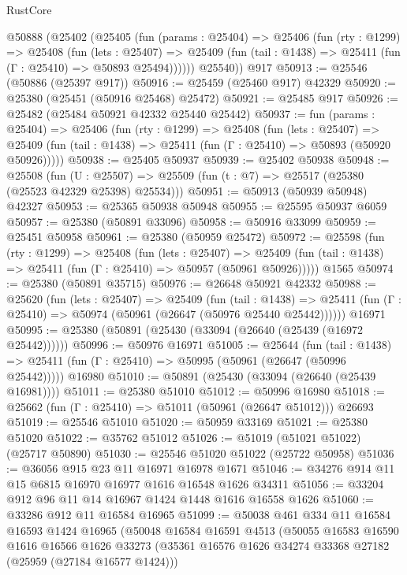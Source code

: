 \begin{lexlean}{RustCore}
\begin{coremodule}
    @50888
      (@25402
        (@25405
          (fun (params : @25404) =>
          @25406
            (fun (rty : @1299) =>
            @25408
              (fun (lets : @25407) =>
              @25409 (fun (tail : @1438) => @25411 (fun (Γ : @25410) => @50893 @25494))))))
        @25540))
    @917
@50913 := @25546 (@50886 (@25397 @917))
@50916 := @25459 (@25460 @917) @42329
@50920 := @25380 (@25451 (@50916 @25468) @25472)
@50921 := @25485 @917
@50926 := @25482 (@25484 @50921 @42332 @25440 @25442)
@50937 := fun (params : @25404) =>
  @25406
    (fun (rty : @1299) =>
    @25408
      (fun (lets : @25407) =>
      @25409 (fun (tail : @1438) => @25411 (fun (Γ : @25410) => @50893 (@50920 @50926)))))
@50938 := @25405 @50937
@50939 := @25402 @50938
@50948 := @25508
    (fun (U : @25507) => @25509 (fun (t : @7) => @25517 (@25380 (@25523 @42329 @25398) @25534)))
@50951 := @50913 (@50939 @50948) @42327
@50953 := @25365 @50938 @50948
@50955 := @25595 @50937 @6059
@50957 := @25380 (@50891 @33096)
@50958 := @50916 @33099
@50959 := @25451 @50958
@50961 := @25380 (@50959 @25472)
@50972 := @25598
    (fun (rty : @1299) =>
    @25408
      (fun (lets : @25407) =>
      @25409 (fun (tail : @1438) => @25411 (fun (Γ : @25410) => @50957 (@50961 @50926)))))
    @1565
@50974 := @25380 (@50891 @35715)
@50976 := @26648 @50921 @42332
@50988 := @25620
    (fun (lets : @25407) =>
    @25409
      (fun (tail : @1438) =>
      @25411 (fun (Γ : @25410) => @50974 (@50961 (@26647 (@50976 @25440 @25442))))))
    @16971
@50995 := @25380 (@50891 (@25430 (@33094 (@26640 (@25439 (@16972 @25442))))))
@50996 := @50976 @16971
@51005 := @25644
    (fun (tail : @1438) => @25411 (fun (Γ : @25410) => @50995 (@50961 (@26647 (@50996 @25442)))))
    @16980
@51010 := @50891 (@25430 (@33094 (@26640 (@25439 @16981))))
@51011 := @25380 @51010
@51012 := @50996 @16980
@51018 := @25662 (fun (Γ : @25410) => @51011 (@50961 (@26647 @51012))) @26693
@51019 := @25546 @51010
@51020 := @50959 @33169
@51021 := @25380 @51020
@51022 := @35762 @51012
@51026 := @51019 (@51021 @51022) (@25717 @50890)
@51030 := @25546 @51020 @51022 (@25722 @50958)
@51036 := @36056 @915 @23 @11 @16971 @16978 @1671
@51046 := @34276 @914 @11 @15 @6815 @16970 @16977 @1616 @16548 @1626 @34311
@51056 := @33204 @912 @96 @11 @14 @16967 @1424 @1448 @1616 @16558 @1626
@51060 := @33286 @912 @11 @16584 @16965
@51099 := @50038
    @461
    @334
    @11
    @16584
    @16593
    @1424
    @16965
    (@50048
      @16584
      @16591
      @4513
      (@50055
        @16583
        @16590
        @1616
        @16566
        @1626
        @33273
        (@35361 @16576 @1626 @34274 @33368 @27182 (@25959 (@27184 @16577 @1424)))

\end{coremodule}
\end{lexlean}
